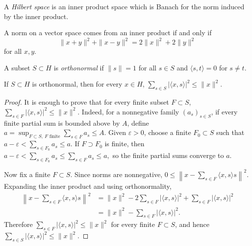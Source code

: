 \begin{definition}
\label{definition-hilbert-space}
A {\it Hilbert space} is an inner product
space which is Banach for the norm induced by
the inner product.
\end{definition}

\begin{theorem}
\label{theorem-parallelogram-law}
A norm on a vector space comes from an inner
product if and only if
$$
\|x+y\|^2+\|x-y\|^2=2\|x\|^2+2\|y\|^2
$$
for all $x,y$.
\end{theorem}

\begin{definition}
\label{definition-orthonormal-set}
A subset $S\subset H$ is {\it orthonormal} if
$\|s\|=1$ for all $s\in S$ and $\langle
s,t\rangle=0$ for $s\neq t$.
\end{definition}

\begin{theorem}
\label{theorem-bessel}
If $S\subset H$ is orthonormal, then for
every $x\in H$,
$
\sum_{s\in S}|\langle x,s\rangle|^2\leq
\|x\|^2.
$
\end{theorem}

\begin{proof}
It is enough to prove that for every finite
subset $F\subset S$,
$
\sum_{s\in F}|\langle x,s\rangle|^2
\leq \|x\|^2.
$
Indeed, for a nonnegative family
$(a_s)_{s\in S}$, if every finite partial sum
is bounded above by $A$, define
$
a=\sup_{F\subset S,\ F\text{ finite}}
\sum_{s\in F}a_s\leq A.
$
Given $\varepsilon>0$, choose a finite
$F_0\subset S$ such that
$
a-\varepsilon<
\sum_{s\in F_0}a_s\leq a.
$
If $F\supset F_0$ is finite, then
$
a-\varepsilon<
\sum_{s\in F_0}a_s
\leq
\sum_{s\in F}a_s
\leq a,
$
so the finite partial sums converge to $a$.

Now fix a finite $F\subset S$. Since norms
are nonnegative,
$
0\leq
\left\|
x-\sum_{s\in F}\langle x,s\rangle s
\right\|^2.
$
Expanding the inner product and using
orthonormality,
\begin{align*}
\left\|
x-\sum_{s\in F}\langle x,s\rangle s
\right\|^2
&=
\|x\|^2
-2\sum_{s\in F}|\langle x,s\rangle|^2
+\sum_{s\in F}|\langle x,s\rangle|^2\\
&=
\|x\|^2-
\sum_{s\in F}|\langle x,s\rangle|^2.
\end{align*}
Therefore
$
\sum_{s\in F}|\langle x,s\rangle|^2
\leq \|x\|^2
$
for every finite $F\subset S$, and hence
$
\sum_{s\in S}|\langle x,s\rangle|^2
\leq \|x\|^2.
$
\end{proof}

